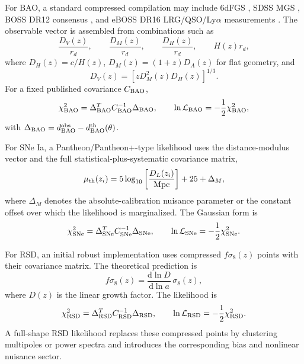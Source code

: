 \documentclass[pdflatex,sn-mathphys-num]{sn-jnl}%
\newcommand{\dd}{\mathrm{d}}
\begin{document}
For BAO, a standard compressed compilation may include 6dFGS \cite{Beutler:2011hx}, SDSS MGS \cite{Ross:2014qpa}, BOSS
DR12 consensus \cite{Alam:2016hwk}, and eBOSS DR16 LRG/QSO/Ly$\alpha$ measurements \cite{Alam:2020sor}. The observable
vector is assembled from combinations such as
\begin{equation}
\frac{D_V(z)}{r_d},\qquad \frac{D_M(z)}{r_d},\qquad
\frac{D_H(z)}{r_d},\qquad H(z)r_d,
\end{equation}
where $D_H(z)=c/H(z)$, $D_M(z)=(1+z)D_A(z)$ for flat geometry, and
\begin{equation}
D_V(z)=\left[zD_M^2(z)D_H(z)\right]^{1/3}.
\end{equation}
For a fixed published covariance $C_{\rm BAO}$,
\begin{equation}
\chi^2_{\rm BAO}=\Delta_{\rm BAO}^{T}C_{\rm BAO}^{-1}\Delta_{\rm BAO},\qquad
\ln {\cal L}_{\rm BAO}=-\frac{1}{2}\chi^2_{\rm BAO},
\end{equation}
with $\Delta_{\rm BAO}=d_{\rm BAO}^{\rm obs}-d_{\rm BAO}^{\rm th}(\theta)$.

For SNe Ia, a Pantheon/Pantheon+-type likelihood \cite{Brout2022} uses the distance-modulus
vector and the full statistical-plus-systematic covariance matrix,
\begin{equation}
\mu_{\rm th}(z_i)=5\log_{10}\left[\frac{D_L(z_i)}{{\rm Mpc}}\right]+25+\Delta_M,
\end{equation}
where $\Delta_M$ denotes the absolute-calibration nuisance parameter or the
constant offset over which the likelihood is marginalized. The Gaussian form is
\begin{equation}
\chi^2_{\rm SNe}=\Delta_{\rm SNe}^{T}C_{\rm SNe}^{-1}\Delta_{\rm SNe},\qquad
\ln {\cal L}_{\rm SNe}=-\frac{1}{2}\chi^2_{\rm SNe}.
\end{equation}

For RSD, an initial robust implementation uses compressed $f\sigma_8(z)$ points
with their covariance matrix. The theoretical prediction is
\begin{equation}
f\sigma_8(z)=\frac{\dd\ln D}{\dd\ln a}\,\sigma_8(z),
\end{equation}
where $D(z)$ is the linear growth factor. The likelihood is
\begin{equation}
\chi^2_{\rm RSD}=\Delta_{\rm RSD}^{T}C_{\rm RSD}^{-1}\Delta_{\rm RSD},\qquad
\ln {\cal L}_{\rm RSD}=-\frac{1}{2}\chi^2_{\rm RSD}.
\end{equation}
A full-shape RSD likelihood replaces these compressed points by clustering
multipoles or power spectra and introduces the corresponding bias and nonlinear
nuisance sector.
\end{document}
